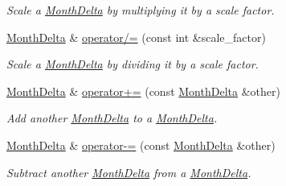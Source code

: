 \begin{DoxyCompactItemize}
\begin{DoxyCompactList}\small\item\em Scale a \hyperlink{structMonthDelta}{Month\-Delta} by multiplying it by a scale factor. \end{DoxyCompactList}\item 
\hyperlink{structMonthDelta}{Month\-Delta} \& \hyperlink{structMonthDelta_aa8333e32a1bcd75fd93410574af2ec00}{operator/=} (const int \&scale\-\_\-factor)
\begin{DoxyCompactList}\small\item\em Scale a \hyperlink{structMonthDelta}{Month\-Delta} by dividing it by a scale factor. \end{DoxyCompactList}\item 
\hyperlink{structMonthDelta}{Month\-Delta} \& \hyperlink{structMonthDelta_aa244bc614894a3daaf8d71f0c9c6202b}{operator+=} (const \hyperlink{structMonthDelta}{Month\-Delta} \&other)
\begin{DoxyCompactList}\small\item\em Add another \hyperlink{structMonthDelta}{Month\-Delta} to a \hyperlink{structMonthDelta}{Month\-Delta}. \end{DoxyCompactList}\item 
\hyperlink{structMonthDelta}{Month\-Delta} \& \hyperlink{structMonthDelta_ad62de2e3686f5b93088eb371e9ff4c87}{operator-\/=} (const \hyperlink{structMonthDelta}{Month\-Delta} \&other)
\begin{DoxyCompactList}\small\item\em Subtract another \hyperlink{structMonthDelta}{Month\-Delta} from a \hyperlink{structMonthDelta}{Month\-Delta}. \end{DoxyCompactList}\end{DoxyCompactItemize}
